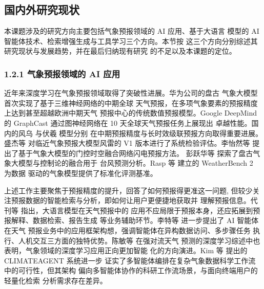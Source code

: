 
\subsection{国内外研究现状}
\label{sec:related-work}

本课题涉及的研究方向主要包括气象预报领域的 AI 应用、基于大语言
模型的 AI 智能体技术、检索增强生成与工具学习三个方向。本节按
这三个方向分别综述其研究现状与发展趋势，并在最后归纳现有研究
的不足以及本课题的定位。

\subsubsection*{1.2.1 \quad 气象预报领域的 AI 应用}

近年来深度学习在气象预报领域取得了突破性进展。华为公司的盘古
气象大模型 \cite{ref16} 首次实现了基于三维神经网络的中期全球
天气预报，在多项气象要素的预报精度上达到甚至超越欧洲中期天气
预报中心的传统数值预报模型。Google DeepMind 的 GraphCast
\cite{ref17} 通过图神经网络在 10 天全球天气预报任务上展现出
卓越性能。国内的风乌 \cite{ref26} 与伏羲 \cite{ref27} 模型分别
在中期预报精度与长时效级联预报方向取得重要进展。盛杰等 \cite{ref7}
对临近气象预报大模型风雷的 V1 版本进行了系统检验评估。李怡然等
\cite{ref6} 提出了基于气象大模型的门控时空融合网络闪电预报方法。
彭跃华等 \cite{ref8} 探索了盘古气象大模型与控制论的融合用于
台风预测分析。Rasp 等 \cite{ref25} 建立的 WeatherBench 2 为数据
驱动的气象模型提供了标准化评测基准。

上述工作主要聚焦于预报精度的提升，回答了如何预报得更准这一问题,
但较少关注预报数据的智能检索与分析，即如何让用户更便捷地获取并
理解预报信息。代刊等 \cite{ref5} 指出，大语言模型在天气预报中的
应用不应局限于预报本身，还应拓展到预报解释、数据检索、报告生成
等业务辅助环节。李特等 \cite{ref2} 进一步提出了 AI 智能体在天气
预报业务中的应用框架构想，强调智能体在异构数据访问、多步骤任务
执行、人机交互三方面的独特优势。陈敏等 \cite{ref9} 在强对流天气
预测的深度学习综述中也表明，气象领域的深度学习应用正向更加智能
化的方向演进。Kim 等 \cite{ref1} 提出的 CLIMATEAGENT 系统进一步
证实了多智能体编排在复杂气象数据科学工作流中的可行性，但其架构
偏向多智能体协作的科研工作流场景，与面向终端用户的轻量化检索
分析需求存在差异。

